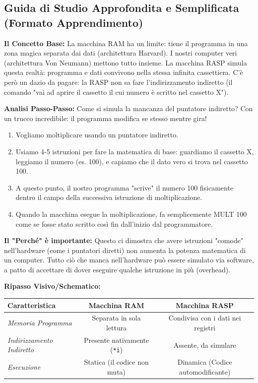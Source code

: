 \documentclass[a4paper, 11pt]{report}
\begin{document}
\vspace{0.5cm}
\subsection*{Guida di Studio Approfondita e Semplificata (Formato Apprendimento)}
\textbf{Il Concetto Base:}
La macchina RAM ha un limite: tiene il programma in una zona magica separata dai dati (architettura Harvard). I nostri computer veri (architettura Von Neumann) mettono tutto insieme. La macchina RASP simula questa realtà: programma e dati convivono nella stessa infinita cassettiera. C'è però un dazio da pagare: la RASP non sa fare l'indirizzamento indiretto (il comando "vai ad aprire il cassetto il cui numero è scritto nel cassetto X").

\textbf{Analisi Passo-Passo:}
Come si simula la mancanza del puntatore indiretto? Con un trucco incredibile: il programma modifica se stesso mentre gira!
\begin{enumerate}
    \item Vogliamo moltiplicare usando un puntatore indiretto.
    \item Usiamo 4-5 istruzioni per fare la matematica di base: guardiamo il cassetto X, leggiamo il numero (es. 100), e capiamo che il dato vero si trova nel cassetto 100.
    \item A questo punto, il nostro programma "scrive" il numero 100 fisicamente dentro il campo della successiva istruzione di moltiplicazione.
    \item Quando la macchina esegue la moltiplicazione, fa semplicemente MULT 100 come se fosse stato scritto così fin dall'inizio dal programmatore.
\end{enumerate}

\textbf{Il "Perché" è importante:}
Questo ci dimostra che avere istruzioni "comode" nell'hardware (come i puntatori diretti) non aumenta la potenza matematica di un computer. Tutto ciò che manca nell'hardware può essere simulato via software, a patto di accettare di dover eseguire qualche istruzione in più (overhead).

\textbf{Ripasso Visivo/Schematico:}
\begin{center}
\begin{tabular}{|l|c|c|}
\hline
\textbf{Caratteristica} & \textbf{Macchina RAM} & \textbf{Macchina RASP} \\
\hline
\textit{Memoria Programma} & Separata in sola lettura & Condivisa con i dati nei registri \\
\hline
\textit{Indirizzamento Indiretto} & Presente nativamente (\texttt{*i}) & Assente, da simulare \\
\hline
\textit{Esecuzione} & Statica (il codice non muta) & Dinamica (Codice automodificante) \\
\hline
\end{tabular}
\end{center}
\end{document}

